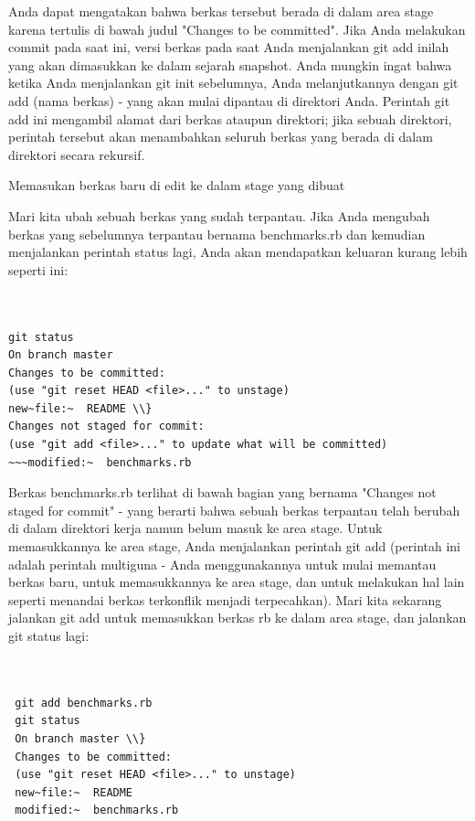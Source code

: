 \noindent 
{\fontsize{14pt}{14pt}\selectfont Anda dapat mengatakan bahwa berkas tersebut berada di dalam area stage karena tertulis di bawah judul "Changes to be committed". Jika Anda melakukan commit pada saat ini, versi berkas pada saat Anda menjalankan $  $git add $  $inilah yang akan dimasukkan ke dalam sejarah snapshot. Anda mungkin ingat bahwa ketika Anda menjalankan $  $git init $  $sebelumnya, Anda melanjutkannya dengan $  $git add (nama berkas) $  $- yang akan mulai dipantau di direktori Anda. Perintah $  $git add $  $ini mengambil alamat dari berkas ataupun direktori; jika sebuah direktori, perintah tersebut akan menambahkan seluruh berkas yang berada di dalam direktori secara rekursif. \\} \par
\noindent 
{\fontsize{14pt}{14pt}\selectfont Memasukan berkas baru di edit ke dalam stage yang dibuat \\} \par
\vspace{14pt}
\noindent 
{\fontsize{14pt}{14pt}\selectfont Mari kita ubah sebuah berkas yang sudah terpantau. Jika Anda mengubah berkas yang sebelumnya terpantau bernama $  $benchmarks.rb $  $dan kemudian menjalankan perintah $  $status $  $lagi, Anda akan mendapatkan keluaran kurang lebih seperti ini: \\} \par

\begin{verbatim}
	

git status
On branch master
Changes to be committed:
(use "git reset HEAD <file>..." to unstage)
new~file:~  README \\}
Changes not staged for commit:
(use "git add <file>..." to update what will be committed)
~~~modified:~  benchmarks.rb

\end{verbatim}
\vspace{14pt}
\noindent 
{\fontsize{14pt}{14pt}\selectfont Berkas benchmarks.rb terlihat di bawah bagian yang bernama "Changes not staged for commit" - yang berarti bahwa sebuah berkas terpantau telah berubah di dalam direktori kerja namun belum masuk ke area stage. Untuk memasukkannya ke area stage, Anda menjalankan perintah $  $git add $  $(perintah ini adalah perintah multiguna - Anda menggunakannya untuk mulai memantau berkas baru, untuk memasukkannya ke area stage, dan untuk melakukan hal lain seperti menandai berkas terkonflik menjadi terpecahkan). Mari kita sekarang jalankan $  $git add $  $untuk memasukkan berkas rb ke dalam area stage, dan jalankan $  $git status $  $lagi: \\} \par
\begin{verbatim}
	

 git add benchmarks.rb
 git status
 On branch master \\}
 Changes to be committed:
 (use "git reset HEAD <file>..." to unstage)
 new~file:~  README
 modified:~  benchmarks.rb
\end{verbatim}

